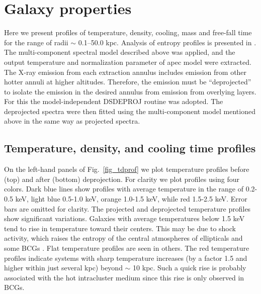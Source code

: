 \documentclass[iop]{emulateapj}
\begin{document}
\section{Galaxy properties}\label{sec:3}
Here we present profiles of temperature, density, cooling, mass and free-fall time for the range of radii $\sim$ 0.1--50.0 kpc. Analysis of entropy profiles is presented in \citet{Babyk17nature}. The multi-component spectral model described above was applied, and the output temperature and normalization parameter of {\sc apec} model were  extracted. The X-ray emission from each extraction annulus includes emission from other hotter annuli at higher altitudes. Therefore, the emission must be ``deprojected'' to isolate the emission in the desired annulus from emission from overlying layers.  For this the model-independent {\sc DSDEPROJ} routine \citep{Russell:08} was adopted. The deprojected spectra were then fitted using the multi-component model mentioned above in the same way as projected spectra.

\subsection{Temperature, density, and cooling time profiles}
On the left-hand panels of Fig.~\ref{fig_tdprof} we plot  temperature profiles before (top) and after (bottom) deprojection. For clarity we plot profiles using four colors. Dark blue lines show profiles with average temperature in the range of 0.2-0.5 keV, light blue 0.5-1.0 keV, orange 1.0-1.5 keV, while red 1.5-2.5 keV. Error bars are omitted for clarity. The projected and deprojected temperature profiles show significant variations. Galaxies with average temperatures below 1.5 keV tend to rise in temperature toward their centers. This may be due to shock activity, which raises the entropy of the central atmospheres of ellipticals and some BCGs \citep{Werner:12}. Flat temperature profiles are seen in others. The red temperature profiles indicate systems with sharp temperature increases (by a factor 1.5 and higher within just several kpc) beyond $\sim$ 10 kpc. Such a quick rise is probably associated with the hot intracluster medium since this rise is only observed in BCGs. 
\end{document}
